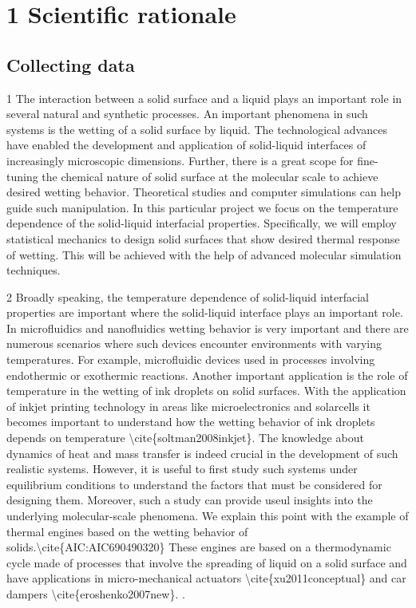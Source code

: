 \section{1 Scientific rationale}
\subsection{Collecting data}

\par 1 The interaction between a solid surface and a liquid plays an important role in several natural and synthetic processes. An important phenomena in such systems is the wetting of a solid surface by liquid. The technological advances have enabled the development and application of solid-liquid interfaces  of increasingly microscopic dimensions. Further, there is a great scope for fine-tuning the chemical nature of solid surface at the molecular scale to achieve desired wetting behavior. Theoretical studies and computer simulations can help guide such manipulation. In this particular project we focus on the temperature dependence of the solid-liquid interfacial properties. Specifically, we will employ statistical mechanics to design solid surfaces that show desired thermal response of wetting. This will be achieved with the help of advanced molecular simulation techniques.
\par 2 Broadly speaking, the temperature dependence of solid-liquid interfacial properties are important where the solid-liquid interface plays an important role. In microfluidics and nanofluidics wetting behavior is very important and there are numerous scenarios where such devices encounter environments with varying temperatures. For example, microfluidic devices used in processes involving endothermic or exothermic reactions. Another important application is the role of temperature in the wetting of ink droplets on solid surfaces. With the application of inkjet printing technology in areas like microelectronics and solarcells it becomes important to understand how the wetting behavior of ink droplets depends on temperature \textbackslash cite\{soltman2008inkjet\}. The knowledge about dynamics of heat and mass transfer is indeed crucial in the development of such realistic systems. However, it is useful to first study such systems under equilibrium conditions to understand the factors that must be considered for designing them. Moreover, such a study can provide useul insights into the underlying molecular-scale phenomena. We explain this point with the example of thermal engines based on the wetting behavior of solids.\textbackslash cite\{AIC:AIC690490320\} These engines are based on a thermodynamic cycle made of processes that involve the spreading of liquid on a solid surface and have applications in micro-mechanical actuators \textbackslash cite\{xu2011conceptual\} and car dampers \textbackslash cite\{eroshenko2007new\}. .
